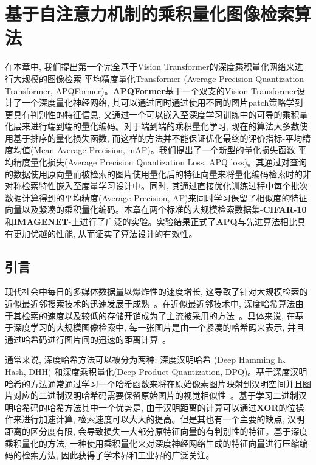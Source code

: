 \chapter{基于自注意力机制的乘积量化图像检索算法}
在本章中, 我们提出第一个完全基于Vision Transformer的深度乘积量化网络来进行大规模的图像检索-平均精度量化Transformer (Average Precision Quantization Transformer, APQFormer)。\textbf{APQFormer}基于一个双支的Vision Transformer设计了一个深度量化神经网络, 其可以通过同时通过使用不同的图片patch策略学到更具有判别性的特征信息, 又通过一个可以嵌入至深度学习训练中的可导的乘积量化层来进行端到端的量化编码。对于端到端的乘积量化学习, 现在的算法大多数使用基于排序的量化损失函数, 而这样的方法并不能保证优化最终的评价指标-平均精度均值(Mean Average Precision, mAP)。我们提出了一个新型的量化损失函数-平均精度量化损失(Average Precision Quantization Loss, APQ loss)。其通过对查询的数据使用原向量而被检索的图片使用量化后的特征向量来将量化编码检索时的非对称检索特性嵌入至度量学习设计中。同时, 其通过直接优化训练过程中每个批次数据计算得到的平均精度(Average Precision, AP)来同时学习保留了相似度的特征向量以及紧凑的乘积量化编码。本章在两个标准的大规模检索数据集-\textbf{CIFAR-10}和\textbf{IMAGENET}-上进行了广泛的实验。实验结果正式了\textbf{APQ}与先进算法相比具有更加优越的性能, 从而证实了算法设计的有效性。
\section{引言}
现代社会中每日的多媒体数据量以爆炸性的速度增长, 这导致了针对大规模检索的近似最近邻搜索技术的迅速发展于成熟~\cite{andoni2006near,shrivastava2014densifying, malkov2018efficient, nie2020deep, li2021dahp}。在近似最近邻技术中, 深度哈希算法由于其检索的速度以及较低的存储开销成为了主流被采用的方法~\cite{zhu2016deep, jiang2018asymmetric, zhang2019improved, cao2017hashnet}。具体来说, 在基于深度学习的大规模图像检索中, 每一张图片是由一个紧凑的哈希码来表示, 并且通过哈希码进行图片间的迅速的距离计算~\cite{jang2020generalized}。\par
通常来说, 深度哈希方法可以被分为两种: 深度汉明哈希 (Deep Hamming h、Hash, DHH) 和深度乘积量化(Deep Product Quantization, DPQ)。基于深度汉明哈希的方法通常通过学习一个哈希函数来将在原始像素图片映射到汉明空间并且图片对应的二进制汉明哈希码需要保留原始图片的视觉相似性~\cite{zhu2016deep,zhang2019improved, cao2017hashnet, cao2018deep, fan2020deep}。基于学习二进制汉明哈希码的哈希方法其中一个优势是, 由于汉明距离的计算可以通过\textbf{XOR}的位操作来进行加速计算, 检索速度可以大大的提高。但是其也有一个主要的缺点, 汉明距离的区分度有限, 会导致损失一大部分原特征向量的有判别性的特征。基于深度乘积量化的方法, 一种使用乘积量化来对深度神经网络生成的特征向量进行压缩编码的检索方法, 因此获得了学术界和工业界的广泛关注。\par

